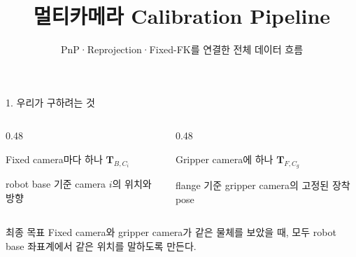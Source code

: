\documentclass[aspectratio=169,11pt]{beamer}
\title{멀티카메라 Calibration Pipeline}
\subtitle{PnP·Reprojection·Fixed-FK를 연결한 전체 데이터 흐름}
\author{}
\date{}
\newcommand{\T}[2]{\mathbf T_{#1,#2}}
\begin{document}
\begin{frame}
  \titlepage
\end{frame}

\begin{frame}{1. 우리가 구하려는 것}
  \begin{columns}[T]
    \begin{column}{0.48\textwidth}
      \begin{block}{Fixed camera마다 하나}
        \centering
        \Large $\T{B}{C_i}$

        \normalsize
        robot base 기준 camera $i$의 위치와 방향
      \end{block}
    \end{column}
    \begin{column}{0.48\textwidth}
      \begin{block}{Gripper camera에 하나}
        \centering
        \Large $\T{F}{C_g}$

        \normalsize
        flange 기준 gripper camera의 고정된 장착 pose
      \end{block}
    \end{column}
  \end{columns}

  \vfill
  \begin{alertblock}{최종 목표}
    Fixed camera와 gripper camera가 같은 물체를 보았을 때, 모두 robot base 좌표계에서 같은 위치를 말하도록 만든다.
  \end{alertblock}
\end{frame}
\end{document}
